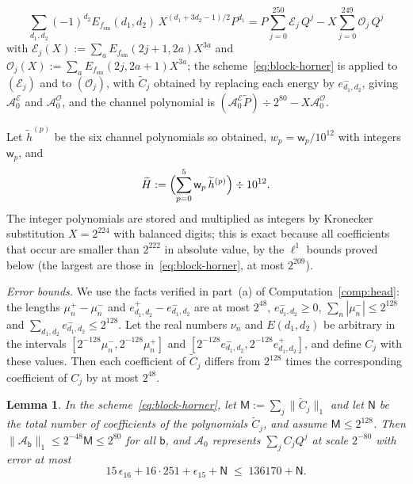 \documentclass[11pt,reqno]{amsart}
\newtheorem{lemma}[theorem]{Lemma}
\theoremstyle{definition}
\numberwithin{equation}{section}
\newcommand{\lone}[1]{\|#1\|_1}
\newcommand{\fsm}{f_{\mathrm{sm}}}
\begin{document}
\begin{enumerate}
  \[
    \sum_{d_1,d_2}(-1)^{d_2}E_{\fsm}(d_1,d_2)\,X^{(d_1+3d_2-1)/2}P^{d_1}
    =P\sum_{j=0}^{250}\mathcal{E}_j\,Q^j-X\sum_{j=0}^{249}\mathcal{O}_j\,Q^j
  \]
  with $\mathcal{E}_j(X):=\sum_aE_{\fsm}(2j+1,2a)X^{3a}$ and $\mathcal{O}_j(X):=\sum_aE_{\fsm}(2j,2a+1)X^{3a}$; the scheme~\eqref{eq:block-horner} is applied to $(\mathcal{E}_j)$ and to $(\mathcal{O}_j)$, with $\widetilde C_j$ obtained by replacing each energy by $e^-_{d_1,d_2}$, giving $\mathcal{A}^{\mathcal{E}}_0$ and $\mathcal{A}^{\mathcal{O}}_0$, and the channel polynomial is $(\mathcal{A}^{\mathcal{E}}_0\widetilde P)\div2^{80}-X\mathcal{A}^{\mathcal{O}}_0$.
\end{enumerate}
Let $\widetilde h^{(p)}$ be the six channel polynomials so obtained, $w_p=\mathsf{w}_p/10^{12}$ with integers $\mathsf{w}_p$, and
\[
  \widetilde H:=\Bigl(\sum_{p=0}^5\mathsf{w}_p\,\widetilde h^{(p)}\Bigr)\div10^{12}.
\]
The integer polynomials are stored and multiplied as integers by Kronecker substitution $X=2^{224}$ with balanced digits; this is exact because all coefficients that occur are smaller than $2^{222}$ in absolute value, by the $\ell^1$ bounds proved below (the largest are those in~\eqref{eq:block-horner}, at most $2^{209}$).

\emph{Error bounds.} We use the facts verified in part~(a) of Computation~\ref{comp:head}: the lengths $\mu_n^+-\mu_n^-$ and $e^+_{d_1,d_2}-e^-_{d_1,d_2}$ are at most $2^{48}$, $e^-_{d_1,d_2}\ge0$, $\sum_n|\mu_n^-|\le2^{128}$ and $\sum_{d_1,d_2}e^-_{d_1,d_2}\le2^{128}$. Let the real numbers $\nu_n$ and $E(d_1,d_2)$ be arbitrary in the intervals $[2^{-128}\mu_n^-,2^{-128}\mu_n^+]$ and $[2^{-128}e^-_{d_1,d_2},2^{-128}e^+_{d_1,d_2}]$, and define $C_j$ with these values. Then each coefficient of $\widetilde C_j$ differs from $2^{128}$ times the corresponding coefficient of $C_j$ by at most $2^{48}$.

\begin{lemma}\label{lem:block-err}
In the scheme~\eqref{eq:block-horner}, let $\mathsf{M}:=\sum_j\lone{\widetilde C_j}$ and let $\mathsf{N}$ be the total number of coefficients of the polynomials $\widetilde C_j$, and assume $\mathsf{M}\le2^{128}$. Then $\lone{\mathcal{A}_{\mathsf{b}}}\le2^{-48}\mathsf{M}\le2^{80}$ for all $\mathsf{b}$, and $\mathcal{A}_0$ represents $\sum_jC_jQ^j$ at scale $2^{-80}$ with error at most
\[
  15\,\epsilon_{16}+16\cdot251+\epsilon_{15}+\mathsf{N}\;\le\;136170+\mathsf{N} .
\]
\end{lemma}
\end{document}
